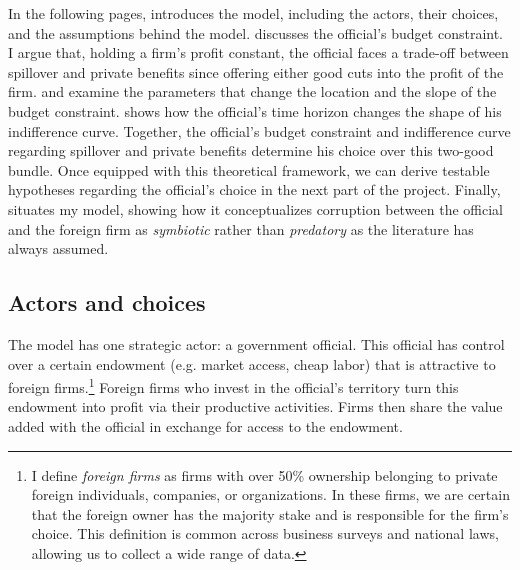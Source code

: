 In the following pages,  introduces the model, including the actors, their choices, and the assumptions behind the model.  discusses the official's budget constraint. I argue that, holding a firm's profit constant, the official faces a trade-off between spillover and private benefits since offering either good cuts into the profit of the firm.  and  examine the parameters that change the location and the slope of the budget constraint.  shows how the official's time horizon changes the shape of his indifference curve. Together, the official's budget constraint and indifference curve regarding spillover and private benefits determine his choice over this two-good bundle. Once equipped with this theoretical framework, we can derive testable hypotheses regarding the official's choice in the next part of the project. Finally,  situates my model, showing how it conceptualizes corruption between the official and the foreign firm as \textit{symbiotic} rather than \textit{predatory} as the literature has always assumed.

\subsection{Actors and choices}
\label{sec:theory_actors_and_choices}

The model has one strategic actor: a government official. This official has control over a certain endowment (e.g. market access, cheap labor) that is attractive to foreign firms.\footnote{I define \textit{foreign firms} as firms with over 50\% ownership belonging to private foreign individuals, companies, or organizations. In these firms, we are certain that the foreign owner has the majority stake and is responsible for the firm's choice. This definition is common across business surveys and national laws, allowing us to collect a wide range of data.} Foreign firms who invest in the official's territory turn this endowment into profit via their productive activities. Firms then share the value added with the official in exchange for access to the endowment. 

